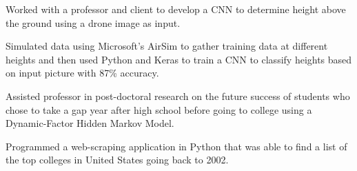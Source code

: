 \message{ !name(cv_12 copy.tex)}\documentclass[letterpaper]{deedy-resume}
\begin{document}
\begin{minipage}[t]{0.65\textwidth}
\begin{tightitemize}
\item Worked with a professor and client to develop a CNN to determine height above the ground using a drone image as input. \\
\item Simulated data using Microsoft's AirSim to gather training data at different heights and then used Python and Keras to train a CNN to classify heights based on input picture with 87\% accuracy.\\
\end{tightitemize}
\sectionspace 

\begin{tightitemize}
\item Assisted professor in post-doctoral research on the future success of students who chose to take a gap year after high school before going to college using a Dynamic-Factor Hidden Markov Model. \\
\item Programmed a web-scraping application in Python that was able to find a list of the top colleges in United States going back to 2002.\\ 
\end{tightitemize}
\sectionspace 

\end{minipage}
\end{document}

